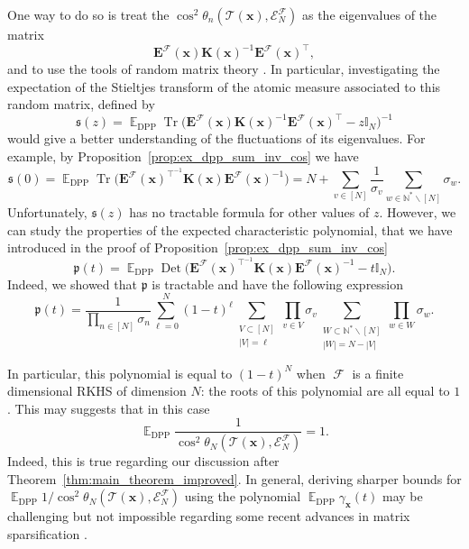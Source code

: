 \documentclass[twoside,11pt]{book}
\numberwithin{theorem}{chapter}
\numberwithin{definition}{chapter}
\numberwithin{proposition}{chapter}
\numberwithin{corollary}{chapter}
\numberwithin{example}{chapter}
\numberwithin{lemma}{chapter}
\numberwithin{assumption}{chapter}
\numberwithin{equation}{chapter}
\numberwithin{figure}{chapter}
\DeclareMathOperator{\Tr}{Tr}
\DeclareMathOperator{\Det}{Det}
\DeclareMathOperator{\DPP}{\mathrm{DPP}}
\DeclareMathOperator{\Tran}{\intercal}
\DeclareMathOperator{\EX}{\mathbb{E}}
\DeclareMathOperator{\F}{\mathcal{F}}
\begin{document}
One way to do so is treat the $\cos^{2} \theta_{n}(\mathcal{T}(\bm{x}),\mathcal{E}^{\mathcal{F}}_{N})$ as the eigenvalues of the matrix 
\begin{equation}
\bm{E}^{\mathcal{F}}(\bm{x})\bm{K}(\bm{x})^{-1}\bm{E}^{\mathcal{F}}(\bm{x})^{\Tran},
\end{equation}
and to use the tools of random matrix theory \parencite{Tao12}. In particular, investigating the expectation of the Stieltjes transform of the atomic measure associated to this random matrix, defined by 
\begin{equation}\label{eq:stieljes}
\mathfrak{s}(z) = \EX_{\DPP} \Tr \big(\bm{E}^{\mathcal{F}}(\bm{x})\bm{K}(\bm{x})^{-1}\bm{E}^{\mathcal{F}}(\bm{x})^{\Tran} -z \mathbb{I}_{N} \big)^{-1}
\end{equation}
would give a better understanding of the fluctuations of its eigenvalues. For example, by Proposition~\ref{prop:ex_dpp_sum_inv_cos} we have
\begin{equation}
\mathfrak{s}(0) =  \EX_{\DPP} \Tr \big(\bm{E}^{\mathcal{F}}(\bm{x})^{\Tran^{-1}}\bm{K}(\bm{x})\bm{E}^{\mathcal{F}}(\bm{x})^{-1} \big) = N +  \sum\limits_{v \in [N]} \frac{1}{\sigma_{v}} \sum\limits_{w \in \mathbb{N}^{*}\smallsetminus [N]} \sigma_{w}.
\end{equation}
Unfortunately, $\mathfrak{s}(z)$ has no tractable formula for other values of $z$. However, we can study the properties of the expected
characteristic polynomial, that we have introduced in the proof of Proposition~\ref{prop:ex_dpp_sum_inv_cos}
\begin{equation}
\mathfrak{p}(t) = \EX_{\DPP} \Det \big(  \bm{E}^{\mathcal{F}}(\bm{x})^{\Tran^{-1}}\bm{K}(\bm{x})\bm{E}^{\mathcal{F}}(\bm{x})^{-1} -t \mathbb{I}_{N} \big).
\end{equation}
Indeed, we showed that $\mathfrak{p}$ is tractable and have the following expression
\begin{equation}\label{eq:conclusion_expected_char_polynomial}
\mathfrak{p}(t) =  \frac{1}{\prod\limits_{n \in [N]}\sigma_n} \sum\limits_{\ell =0}^{N} (1-t)^{\ell} \sum\limits_{\substack{V \subset [N]\\|V| = \ell}} \prod\limits_{v \in V}\sigma_{v}  \sum\limits_{\substack{W \subset \mathbb{N}^{*} \smallsetminus[N]\\  |W|= N-|V|}}  \prod\limits_{w \in W}\sigma_{w}.
\end{equation}

In particular, this polynomial is equal to $(1-t)^{N}$ when $\F$ is a finite dimensional RKHS of dimension $N$: the roots of this polynomial are all equal to $1$. This may suggests that in this case
\begin{equation}
\EX_{\DPP}\frac{1}{\cos^{2}\theta_{N}(\mathcal{T}(\bm{x}), \mathcal{E}_{N}^{\F})} =1.
\end{equation}
Indeed, this is true regarding our discussion after Theorem~\ref{thm:main_theorem_improved}. In general, deriving sharper bounds for $\EX_{\DPP}1 \big/ \cos^{2}\theta_{N}(\mathcal{T}(\bm{x}), \mathcal{E}_{N}^{\F})$ using the polynomial $\EX_{\DPP} \gamma_{\bm{x}}(t)$ may be challenging but not impossible regarding some recent advances in matrix sparsification \citep*{MaSpSr15}. 
\end{document}
